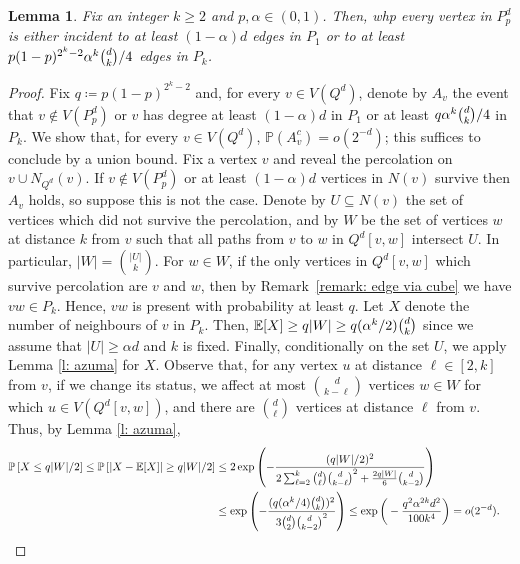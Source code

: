 \documentclass{article}
\newtheorem{lemma}[thm]{Lemma}
\theoremstyle{definition}
\begin{document}
\begin{lemma}\label{lem:min degree}
Fix an integer $k\ge 2$ and $p,\alpha\in (0,1)$. Then, whp every vertex in $P^d_p$ is either incident to at least $(1-\alpha)d$ edges in $P_1$ or to at least $p(1-p)^{2^k-2} \alpha^k \tbinom{d}{k}/4$ edges in $P_k$.
\end{lemma}
\begin{proof}
Fix $q \coloneqq p(1-p)^{2^k-2}$ and, for every $v\in V(Q^d)$, denote by $A_v$ the event that $v\notin V(P^d_p)$ or $v$ has degree at least $(1-\alpha)d$ in $P_1$ or at least $q \alpha^k \tbinom{d}{k}/4$ in $P_k$. 
We show that, for every $v\in V(Q^d)$, $\mathbb P(A_v^c)=o(2^{-d})$; this suffices to conclude by a union bound. 
Fix a vertex $v$ and reveal the percolation on $v\cup N_{Q^d}(v)$. If $v\notin V(P^d_p)$ or at least $(1-\alpha)d$ vertices in $N(v)$ survive then $A_v$ holds, so suppose this is not the case. 
Denote by $U\subseteq N(v)$ the set of vertices which did not survive the percolation, and by $W$ be the set of vertices $w$ at distance $k$ from $v$ such that all paths from $v$ to $w$ in $Q^d[v,w]$ intersect $U$. 
In particular, $|W|=\binom{|U|}{k}$. For $w\in W$, if the only vertices in $Q^d[v,w]$ which survive percolation are $v$ and $w$, then by Remark~\ref{remark: edge via cube} we have $vw\in P_k$. Hence, $vw$ is present with probability at least $q$. 
Let $X$ denote the number of neighbours of $v$ in $P_k$. Then, $\mathbb E[X]\geq q|W| \geq q(\alpha^k/2)\tbinom{d}{k}$ since we assume that $|U|\ge \alpha d$ and $k$ is fixed. 
Finally, conditionally on the set $U$, we apply Lemma \ref{l: azuma} for $X$.
Observe that, for any vertex $u$ at distance $\ell\in [2,k]$ from $v$, if we change its status, we affect at most $\binom{d}{k-\ell}$ vertices $w\in W$ for which $u\in V(Q^d[v,w])$, and there are $\binom{d}{\ell}$ vertices at distance $\ell$ from $v$. Thus, by Lemma \ref{l: azuma},
\begin{align*}
    \mathbb{P}\left[X\le q|W|/2\right]\le \mathbb{P}\left[|X-\mathbb{E}[X]|\ge q|W|/2\right]
    &\le 2\exp\left(-\frac{(q|W|/2)^2}{2\sum_{\ell=2}^k\binom{d}{\ell}\binom{d}{k-\ell}^2+\frac{2q|W|}{6}\binom{d}{k-2}}\right)\\
    &\le \exp\left(-\frac{(q(\alpha^k/4)\tbinom{d}{k})^2}{3\binom{d}{2}\binom{d}{k-2}^2}\right)\le \exp\bigg(-\frac{q^2 \alpha^{2k} d^2}{100k^4}\bigg)=o(2^{-d}).&\qedhere
\end{align*}
\end{proof}
\end{document}
